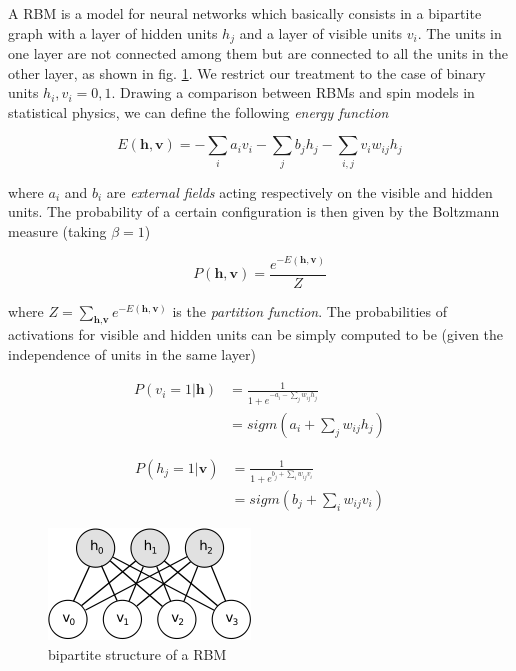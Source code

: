 \documentclass[notitlepage]{revtex4-1}
\begin{document}
A RBM is a model for neural networks which basically consists in a bipartite graph with a layer of hidden units \(h_j\) and a layer of visible units \(v_i\). The units in one layer are not connected among them but are connected to all the units in the other layer, as shown in fig. \ref{fig:rbm}. We restrict our treatment to the case of binary units \(h_i,v_i = 0,1\). Drawing a comparison between RBMs and spin models in statistical physics, we can define the following \textit{energy function}

\begin{equation}
E(\textbf{h},\textbf{v}) = - \sum_i a_i v_i - \sum_j b_j h_j - \sum_{i,j} v_i w_{ij} h_j
\label{eq:ef}
\end{equation}

where \(a_i\) and \(b_i\) are \textit{external fields} acting respectively on the visible and hidden units. The probability of a certain configuration is then given by the Boltzmann measure (taking \(\beta = 1\))

\begin{equation}
P(\textbf{h},\textbf{v}) = \frac{e^{-E(\textbf{h},\textbf{v})}}{Z}
\end{equation}

where \( \textstyle Z = \sum_{\textbf{h},\textbf{v}} e^{-E(\textbf{h},\textbf{v})}\) is the \textit{partition function}. The probabilities of activations for visible and hidden units can be simply computed to be (given the independence of units in the same layer)

\begin{align}
P(v_i = 1 | \textbf{h}) &  = \frac{1}{1+e^{-a_i - \sum_{j} w_{ij} h_j}} \nonumber \\
& = sigm \left(a_i + \sum_{j} w_{ij} h_j \right)
\label{eq:act_vis}
\end{align}

\begin{align}
P(h_j = 1 | \textbf{v}) & = \frac{1}{1+e^{b_j + \sum_i w_{ij} v_i}} \nonumber \\
& = sigm \left(b_j + \sum_i w_{ij} v_i \right)
\label{eq:act_hid}
\end{align}

\begin{figure}
  \centering
  \includegraphics{rbm.png}
  \caption{bipartite structure of a RBM}
  \label{fig:rbm}
\end{figure}
\end{document}
